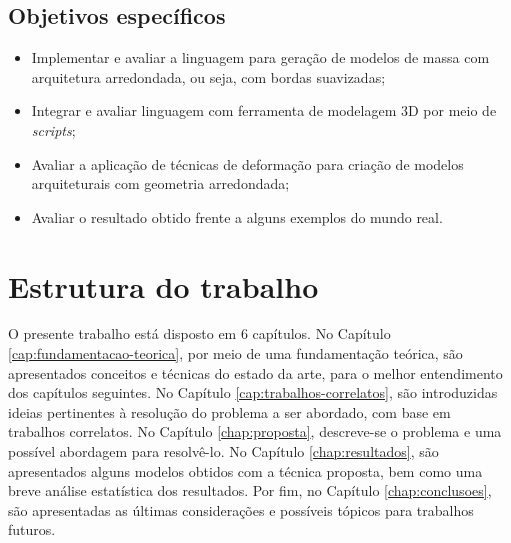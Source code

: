 \subsection{Objetivos específicos}
\label{sec:objetivos_especificos}

\begin{itemize}
    \item Implementar e avaliar a linguagem para geração de modelos de massa com arquitetura arredondada, ou seja, com bordas suavizadas;
    \item Integrar e avaliar linguagem com ferramenta de modelagem 3D por meio de \textit{scripts};
    \item Avaliar a aplicação de técnicas de deformação para criação de modelos arquiteturais com geometria arredondada;
    \item Avaliar o resultado obtido frente a alguns exemplos do mundo real.
\end{itemize}

\section{Estrutura do trabalho}
\label{sec:estrutura_trabalho}

O presente trabalho está disposto em 6 capítulos. No Capítulo \ref{cap:fundamentacao-teorica}, por meio de uma fundamentação teórica, são apresentados conceitos e técnicas do estado da arte, para o melhor entendimento dos capítulos seguintes. No Capítulo \ref{cap:trabalhos-correlatos}, são introduzidas ideias pertinentes à resolução do problema a ser abordado, com base em trabalhos correlatos. No Capítulo \ref{chap:proposta}, descreve-se o problema e uma possível abordagem para resolvê-lo. No Capítulo \ref{chap:resultados}, são apresentados alguns modelos obtidos com a técnica proposta, bem como uma breve análise estatística dos resultados. Por fim, no Capítulo \ref{chap:conclusoes}, são apresentadas as últimas considerações e possíveis tópicos para trabalhos futuros.